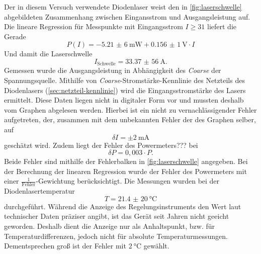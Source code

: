 \documentclass[../bericht.tex]{subfiles}
\begin{document}
        Der in diesem Versuch verwendete Diodenlaser weist den in \cref{fig:laserschwelle} abgebildeten Zusammenhang zwischen Eingansstrom und Ausgangsleistung auf. Die lineare Regression f\"ur Messpunkte mit Eingangsstrom $I\ge 31$ liefert die Gerade
        \begin{equation}
          P(I)=-\SI{5,21(6)}{\milli\watt} + \SI{0,156(1)}{\volt}\cdot I
          \label{eq:laserschwellen-plot}
        \end{equation}
        Und damit die Laserschwelle
        \begin{equation}
          I_\mathrm{Schwelle}=\SI{33,37(56)}{\ampere}.
          \label{eq:laserschwelle}
        \end{equation}
        Gemessen wurde die Ausgangsleistung in Abh\"angigkeit des \textit{Coarse} der Spannungsquelle. Mithilfe von \textit{Coarse}-Stromst\"arke-Kennlinie des Netzteils des Diodenlasers (\cref{sec:netzteil-kennlinie}) wird die Eingangsstromst\"arke des Lasers ermittelt. Diese Daten liegen nicht in digitaler Form vor und mussten deshalb vom Graphen abgelesen werden. Hierbei ist ein nicht zu vernachl\"assigender Fehler aufgetreten, der, zusammen mit dem unbekannten Fehler der des Graphen selber, auf
        \begin{equation*}
          \delta I = \pm \SI{2}{\milli\ampere}
        \end{equation*}
        gesch\"atzt wird. Zudem liegt der Fehler des Powermeters??? bei
        \begin{equation*}
          \delta P = 0,003 \cdot P.
        \end{equation*}
        Beide Fehler sind mithilfe der Fehlerbalken in \cref{fig:laserschwelle} angegeben. Bei der Berechnung der linearen Regression wurde der Fehler des Powermeters mit einer $\frac{1}{\mathrm{Fehler}}$-Gewichtung ber\"ucksichtigt. Die Messungen wurden bei der Diodenlasertemperatur
        \begin{equation*}
          T=\SI{21,4(20)}{\celsius}
        \end{equation*}
        durchgef\"uhrt. W\"ahrend die Anzeige des Regelungsinstruments den Wert laut technischer Daten pr\"aziser angibt, ist das Ger\"at seit Jahren nicht geeicht geworden. Deshalb dient die Anzeige nur als Anhaltspunkt, bzw. f\"ur Temperaturdifferenzen, jedoch nicht f\"ur absolute Temperaturmessungen. Dementsprechen gro\ss{} ist der Fehler mit $\SI{2}{\celsius}$  gew\"ahlt.
\end{document}

